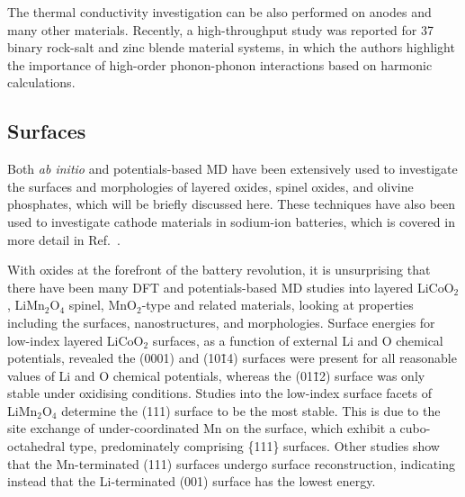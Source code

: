 \documentclass[../main.tex]{subfiles}
\begin{document}
The thermal conductivity investigation can be also performed on anodes and many other materials.\cite{qian2016anisotropic, wei2018tunable} Recently, a high-throughput study was reported for 37 binary rock-salt and zinc blende material systems, in which the authors highlight the importance of high-order phonon-phonon interactions based on harmonic calculations.\cite{xia2020high} 

\subsection{Surfaces}
\cite{zhang2013nanomaterials}  Both \textit{ab initio} and potentials-based MD have been extensively used to investigate the surfaces and morphologies of layered oxides, spinel oxides, and olivine phosphates, which will be briefly discussed here. These techniques have also been used to investigate cathode materials in sodium-ion batteries, which is covered in more detail in Ref.~.

With oxides at the forefront of the battery revolution, it is unsurprising that there have been many DFT and potentials-based MD studies into layered LiCoO$_2$, LiMn$_2$O$_4$ spinel, MnO$_2$-type and related materials, looking at properties including the surfaces, nanostructures, and morphologies.\cite{kramer2009tailoring,xu2011identifying, daheron2009surface,kim2012first,benedek2011simulation,karim2013surface,leung2012first, tompsett2013nanostructuring} Surface energies for low-index layered LiCoO$_2$ surfaces, as a function of external Li and O chemical potentials, revealed the (0001) and (10\={1}4) surfaces were present for all reasonable values of Li and O chemical potentials, whereas the (01\={1}2) surface was only stable under oxidising conditions.\cite{kramer2009tailoring} Studies into the low-index surface facets of LiMn$_2$O$_4$ determine the (111) surface to be the most stable. This is due to the site exchange of under-coordinated Mn on the surface, which exhibit a cubo-octahedral type, predominately comprising \{111\} surfaces. \cite{karim2013surface} Other studies show that the Mn-terminated (111) surfaces undergo surface reconstruction, indicating instead that the Li-terminated (001) surface has the lowest energy.\cite{benedek2011simulation}
\end{document}

